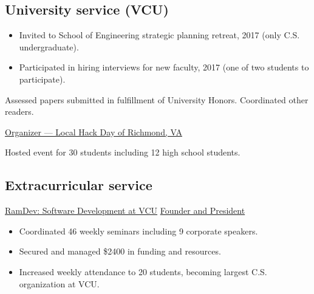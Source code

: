 \documentclass[11pt,letterpaper,serif]{moderncv}
\begin{document}
\subsection{University service (VCU)}
{
	\begin{adjustwidth}{.25in}{}
		\begin{itemize}%
			\item Invited to School of Engineering strategic planning retreat, 2017 (only C.S. undergraduate).
			\item Participated in hiring interviews for new faculty, 2017 (one of two students to participate).
		\end{itemize}
	\end{adjustwidth}
}

{
	\begin{adjustwidth}{.25in}{}
		Assessed papers submitted in fulfillment of University Honors. Coordinated other readers.
	\end{adjustwidth}
}




{\href{https://localhackday.mlh.io/}{Organizer --- Local Hack Day of Richmond, VA}}
{}{}
{
	\begin{adjustwidth}{.25in}{}
		Hosted event for 30 students including 12 high school students.
	\end{adjustwidth}
}

\subsection{Extracurricular service}
{\href{https://vcuramdev.github.io/}{RamDev: Software Development at VCU}}
{\href{https://vcuramdev.github.io/}{Founder and President}}
{}{}
{
	\begin{adjustwidth}{.25in}{}
		\begin{itemize}
			\item Coordinated 46 weekly seminars including 9 corporate speakers.
			\item Secured and managed \$2400 in funding and resources.
			\item Increased weekly attendance to 20 students, becoming largest C.S. organization at VCU.
		\end{itemize}
	\end{adjustwidth}
}
\end{document}
